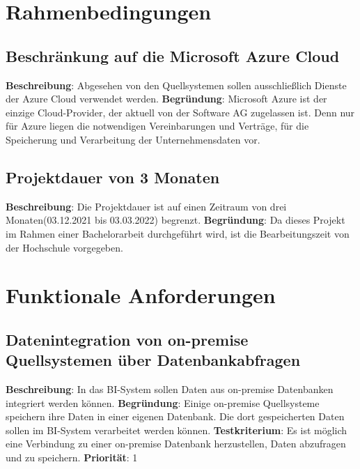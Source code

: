 \section{Rahmenbedingungen} 

\subsection{Beschränkung auf die Microsoft Azure Cloud} \label{sec:anforderungsspezifikation:azureCloud}
\textbf{Beschreibung}: Abgesehen von den Quellsystemen sollen ausschließlich Dienste der Azure Cloud verwendet werden.
\newline \textbf{Begründung}: Microsoft Azure ist der einzige Cloud-Provider, der aktuell von der Software AG zugelassen ist. Denn nur für Azure liegen die notwendigen Vereinbarungen und Verträge, für die Speicherung und Verarbeitung der Unternehmensdaten vor.

\subsection{Projektdauer von 3 Monaten} \label{sec:anforderungsspezifikation:projektDauer}
\textbf{Beschreibung}: Die Projektdauer ist auf einen Zeitraum von drei Monaten(03.12.2021 bis 03.03.2022) begrenzt.
\newline \textbf{Begründung}: Da dieses Projekt im Rahmen einer Bachelorarbeit durchgeführt wird, ist die Bearbeitungszeit von der Hochschule vorgegeben.

\section{Funktionale Anforderungen} \label{sec:anforderungsspezifikation:funktionaleAnforderungen}

\subsection{Datenintegration von on-premise Quellsystemen über Datenbankabfragen} \label{sec:anforderungsspezifikation:datenintegrationOnPremDB}
\textbf{Beschreibung}: In das BI-System sollen Daten aus on-premise Datenbanken integriert werden können.
\newline \textbf{Begründung}: Einige on-premise Quellsysteme speichern ihre Daten in einer eigenen Datenbank. Die dort gespeicherten Daten sollen im BI-System verarbeitet werden können.
\newline \textbf{Testkriterium}: Es ist möglich eine Verbindung zu einer on-premise Datenbank herzustellen, Daten abzufragen und zu speichern.
\newline \textbf{Priorität}: 1


